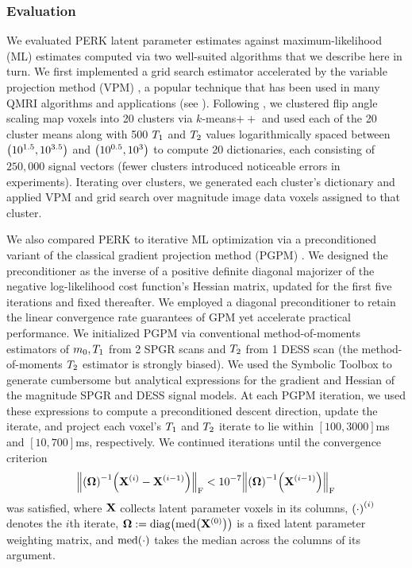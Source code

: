 \subsubsection{Evaluation}
\label{sss,perk,exp,meth,eval}

We evaluated PERK latent parameter estimates
against maximum-likelihood (ML) estimates
computed via two well-suited algorithms
that we describe here in turn.
We first implemented a grid search estimator
accelerated by the variable projection method (VPM) \cite{golub:03:snl},
a popular technique 
that has been used
in many QMRI algorithms and applications
(see \eg 
\cite{%
	gong:92:aft,%
	haldar:07:mle,%
	hernando:08:jeo,%
	barral:10:arm,%
	ma:13:mrf,%
	mcgivney:14:scf,%
	trzasko:13:etf,%
	zhao:15:amp,%
	zhao:16:mlr,%
	he:16:ahd,%
	nataraj:17:oms%
}%
).
Following \cite{nataraj:17:oms},
we clustered flip angle scaling map voxels into 20 clusters
via $k$-means$++$ \cite{arthur:07:kmt}
and used each of the 20 cluster means
along with 
500 $T_1$ and $T_2$ values
logarithmically spaced 
between $\paren{{10}^{1.5}, {10}^{3.5}}$ 
and $\paren{{10}^{0.5},{10}^{3}}$
to compute 20 dictionaries,
each consisting of $250,000$ signal vectors
(fewer clusters introduced noticeable errors
in experiments).
Iterating over clusters,
we generated each cluster's dictionary
and applied VPM and grid search
over magnitude image data voxels
assigned to that cluster.

We also compared PERK 
to iterative ML optimization
via a preconditioned variant 
of the classical gradient projection method (PGPM) \cite{rosen:60:tgp}.
We designed the preconditioner 
as the inverse 
of a positive definite diagonal majorizer
of the negative log-likelihood cost function's Hessian matrix,
updated for the first five iterations
and fixed thereafter. 
We employed a diagonal preconditioner
to retain the linear convergence rate guarantees
of GPM \cite{bertsekas:82:pnm}
yet accelerate practical performance.
We initialized PGPM 
via conventional method-of-moments estimators
of $m_0,T_1$ from 2 SPGR scans \cite{gupta:77:anl}
and $T_2$ from 1 DESS scan \cite{bruder:88:ans}
(the method-of-moments $T_2$ estimator is strongly biased). 
We used the \matlab Symbolic Toolbox
to generate cumbersome but analytical expressions
for the gradient and Hessian 
of the magnitude SPGR and DESS signal models.
At each PGPM iteration,
we used these expressions
to compute a preconditioned descent direction,
update the iterate,
and project each voxel's $T_1$ and $T_2$ iterate
to lie within $[100,3000]$ms and $[10,700]$ms,
respectively.
We continued iterations
until the convergence criterion
\begin{align}
	\frob{\inv{\bmOmega}\paren{\iter{\bmX}{i}-\iter{\bmX}{i-1}}} 
		< 10^{-7} \frob{\inv{\bmOmega}\paren{\iter{\bmX}{i-1}}}
	\label{eq:conv-crit}
\end{align}
was satisfied,
where $\mathbf{X}$ collects latent parameter voxels 
in its columns,
$\iter{\paren{\cdot}}{i}$ denotes the $i$th iterate,
$\bmOmega := \diag{\med{\iter{\bmX}{0}}}$ 
is a fixed latent parameter weighting matrix,
and $\med{\cdot}$ takes the median
across the columns of its argument.

